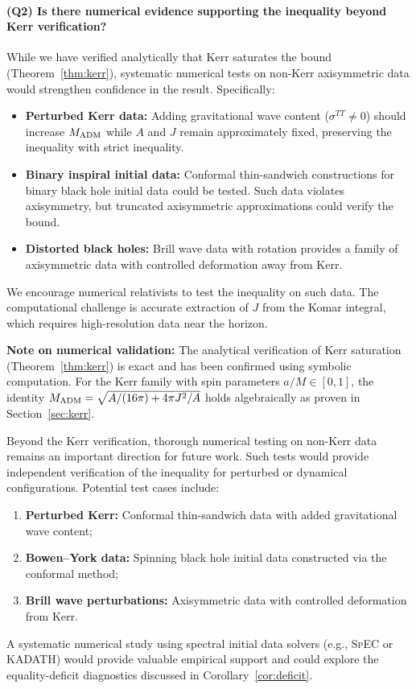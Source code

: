 \paragraph{(Q2) Is there numerical evidence supporting the inequality beyond Kerr verification?}
While we have verified analytically that Kerr saturates the bound (Theorem~\ref{thm:kerr}), systematic numerical tests on non-Kerr axisymmetric data would strengthen confidence in the result. Specifically:
\begin{itemize}
    \item \textbf{Perturbed Kerr data:} Adding gravitational wave content ($\sigma^{TT} \neq 0$) should increase $M_{\mathrm{ADM}}$ while $A$ and $J$ remain approximately fixed, preserving the inequality with strict inequality.
    \item \textbf{Binary inspiral initial data:} Conformal thin-sandwich constructions \cite{cookpfeiffer2004} for binary black hole initial data could be tested. Such data violates axisymmetry, but truncated axisymmetric approximations could verify the bound.
    \item \textbf{Distorted black holes:} Brill wave data with rotation \cite{brilllindquist1963} provides a family of axisymmetric data with controlled deformation away from Kerr.
\end{itemize}
We encourage numerical relativists to test the inequality on such data. The computational challenge is accurate extraction of $J$ from the Komar integral, which requires high-resolution data near the horizon.

\textbf{Note on numerical validation:} The analytical verification of Kerr saturation (Theorem~\ref{thm:kerr}) is exact and has been confirmed using symbolic computation. For the Kerr family with spin parameters $a/M \in [0, 1]$, the identity $M_{\mathrm{ADM}} = \sqrt{A/(16\pi) + 4\pi J^2/A}$ holds algebraically as proven in Section~\ref{sec:kerr}.

Beyond the Kerr verification, thorough numerical testing on non-Kerr data remains an important direction for future work. Such tests would provide independent verification of the inequality for perturbed or dynamical configurations. Potential test cases include:
\begin{enumerate}
    \item \textbf{Perturbed Kerr:} Conformal thin-sandwich data with added gravitational wave content;
    \item \textbf{Bowen--York data:} Spinning black hole initial data constructed via the conformal method;
    \item \textbf{Brill wave perturbations:} Axisymmetric data with controlled deformation from Kerr.
\end{enumerate}
A systematic numerical study using spectral initial data solvers (e.g., \textsc{SpEC} or \textsc{KADATH}) would provide valuable empirical support and could explore the equality-deficit diagnostics discussed in Corollary~\ref{cor:deficit}.

